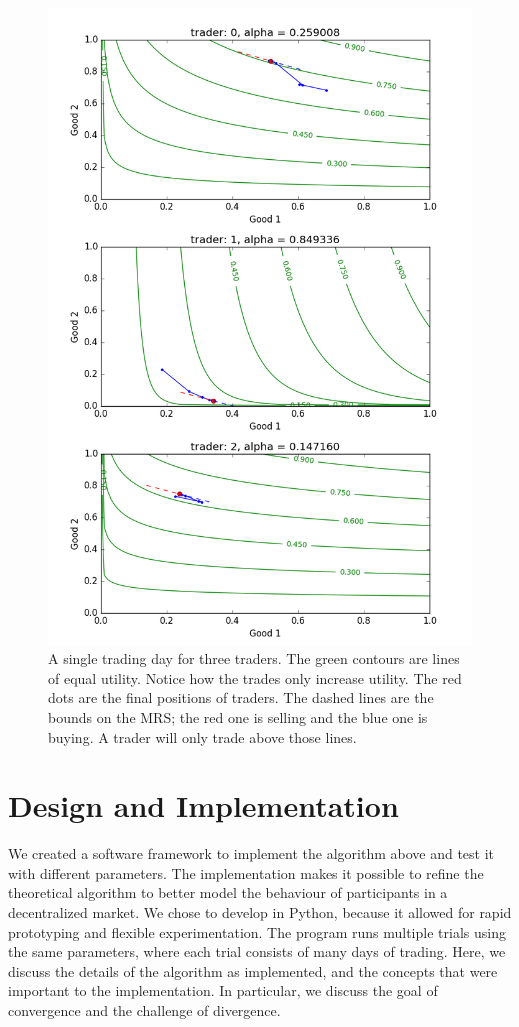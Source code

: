 \documentclass[12pt,a4paper,titlepage]{article}
\begin{document}
\begin{figure}[H]
    \centering
    \includegraphics[width=\textwidth]{allocations_(seed_13).png}
    \caption{
      A single trading day for three traders.
      The green contours are lines of equal utility.
      Notice how the trades only increase utility.
      The red dots are the final positions of traders.
      The dashed lines are the bounds on the MRS; the red one is selling and the blue one is buying.
      A trader will only trade above those lines.
    }
    \label{fig:day}
\end{figure}

\section{Design and Implementation}\label{desimp}
We created a software framework to implement the algorithm above and test it with different parameters.
The implementation makes it possible to refine the theoretical algorithm to better model the behaviour of participants in a decentralized market.
We chose to develop in Python, because it allowed for rapid prototyping and flexible experimentation.
The program runs multiple trials using the same parameters, where each trial consists of many days of trading.
Here, we discuss the details of the algorithm as implemented, and the concepts that were important to the implementation.
In particular, we discuss the goal of convergence and the challenge of divergence.
\end{document}
